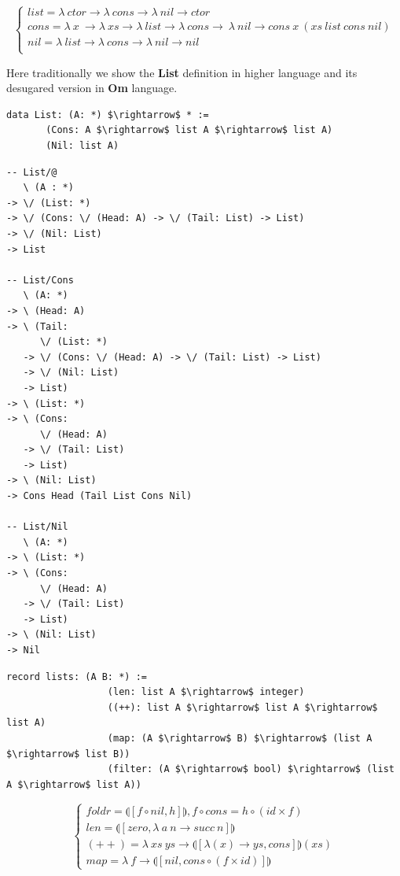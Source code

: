 \documentclass{aip-cp}
\begin{document}
$$
\begin{cases}
list = \lambda\ ctor \rightarrow \lambda\ cons \rightarrow \lambda\ nil \rightarrow ctor\\
cons = \lambda\ x\ \rightarrow \lambda\ xs \rightarrow \lambda\ list \rightarrow \lambda\ cons \rightarrow\ \lambda\ nil \rightarrow cons\ x\ (xs\ list\ cons\ nil)\\
nil = \lambda\ list \rightarrow \lambda\ cons \rightarrow \lambda\ nil \rightarrow nil\\
\end{cases}
$$

Here traditionally we show the {\bf List} definition in higher language and its
desugared version in {\bf Om} language.

\begin{lstlisting}[mathescape=true]
  data List: (A: *) $\rightarrow$ * :=
       (Cons: A $\rightarrow$ list A $\rightarrow$ list A)
       (Nil: list A)
\end{lstlisting}

\begin{lstlisting}[mathescape=true]
-- List/@
   \ (A : *)
-> \/ (List: *)
-> \/ (Cons: \/ (Head: A) -> \/ (Tail: List) -> List)
-> \/ (Nil: List)
-> List

-- List/Cons
   \ (A: *)
-> \ (Head: A)
-> \ (Tail:
      \/ (List: *)
   -> \/ (Cons: \/ (Head: A) -> \/ (Tail: List) -> List)
   -> \/ (Nil: List)
   -> List)
-> \ (List: *)
-> \ (Cons:
      \/ (Head: A)
   -> \/ (Tail: List)
   -> List)
-> \ (Nil: List)
-> Cons Head (Tail List Cons Nil)

-- List/Nil
   \ (A: *)
-> \ (List: *)
-> \ (Cons:
      \/ (Head: A)
   -> \/ (Tail: List)
   -> List)
-> \ (Nil: List)
-> Nil
\end{lstlisting}

\begin{lstlisting}[mathescape=true]
           record lists: (A B: *) :=
                  (len: list A $\rightarrow$ integer)
                  ((++): list A $\rightarrow$ list A $\rightarrow$ list A)
                  (map: (A $\rightarrow$ B) $\rightarrow$ (list A $\rightarrow$ list B))
                  (filter: (A $\rightarrow$ bool) $\rightarrow$ (list A $\rightarrow$ list A))
\end{lstlisting}

$$
\begin{cases}
foldr = \llparenthesis [ f \circ nil , h] \rrparenthesis, f \circ cons = h \circ (id \times f)\\
len = \llparenthesis [ zero, \lambda\ a\ n \rightarrow succ\ n ] \rrparenthesis \\
(++) = \lambda\ xs\ ys \rightarrow \llparenthesis [ \lambda (x) \rightarrow ys, cons ] \rrparenthesis (xs) \\
map = \lambda\ f \rightarrow \llparenthesis [ nil, cons \circ (f \times id)] \rrparenthesis
\end{cases}
$$
\end{document}
